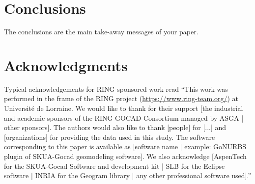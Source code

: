 \documentclass[final]{ring}
\begin{document}
\section*{Conclusions}

The conclusions are the main take-away messages of your paper. 

\section*{Acknowledgments}

Typical acknowledgements for RING sponsored work read ``This work was performed
in the frame of the RING project (\url{https://www.ring-team.org/})
at Université de Lorraine. We would like to thank for their support [the
industrial and academic sponsors of the RING-GOCAD Consortium managed by ASGA |
other sponsors]. The authors would also like to thank [people] for [...] and
[organizations] for providing the data used in this study. The software
corresponding to this paper is available as [software name | example: GoNURBS
plugin of SKUA-Gocad geomodeling software]. We also acknowledge [AspenTech for the SKUA-Gocad Software and development kit | SLB for the Eclipse software | INRIA for the Geogram library | any other professional software used].''


\end{document}
